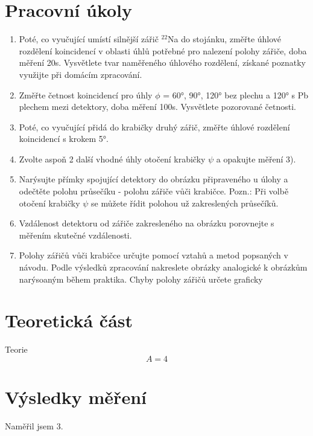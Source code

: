 \documentclass[10pt,a4paper]{article}
\newcommand{\°}{\degree}
\begin{document}


\section{Pracovní úkoly}
\begin{enumerate}
    \item Poté, co vyučující umístí silnější zářič ${}^{22}$Na do stojánku, změřte úhlové rozdělení koincidencí v oblasti úhlů potřebné pro nalezení polohy zářiče, doba měření 20s. Vysvětlete tvar naměřeného úhlového rozdělení, získané poznatky využijte při domácím zpracování.

    \item Změřte četnost koincidencí pro úhly $\phi$ = 60°, 90°, 120° bez plechu a 120° s Pb plechem mezi detektory, doba měření 100s. Vysvětlete pozorované četnosti.
    
    \item Poté, co vyučující přidá do krabičky druhý zářič, změřte úhlové rozdělení koincidencí s krokem 5°.
    
    \item Zvolte aspoň 2 další vhodné úhly otočení krabičky $\psi$ a opakujte měření 3).
    
    \item Narýsujte přímky spojující detektory do obrázku připraveného u úlohy a odečtěte polohu průsečíku - polohu zářiče vůči krabičce. Pozn.: Při volbě otočení krabičky $\psi$ se můžete řídit polohou už zakreslených průsečíků.
    
    \item Vzdálenost detektoru od zářiče zakresleného na obrázku porovnejte s měřením skutečné vzdálenosti.
    
    \item Polohy zářičů vůči krabičce určujte pomocí vztahů a metod popsaných v návodu. Podle výsledků zpracování nakreslete obrázky analogické k obrázkům narýsoaným během praktika. Chyby polohy zářičů určete graficky
\end{enumerate}


\section{Teoretická část}
Teorie\cite{DUMMY:1}
\begin{equation*}
    A = 4
    \label{A}
\end{equation*}


\section{Výsledky měření}
Naměřil jsem 3.
\end{document}

